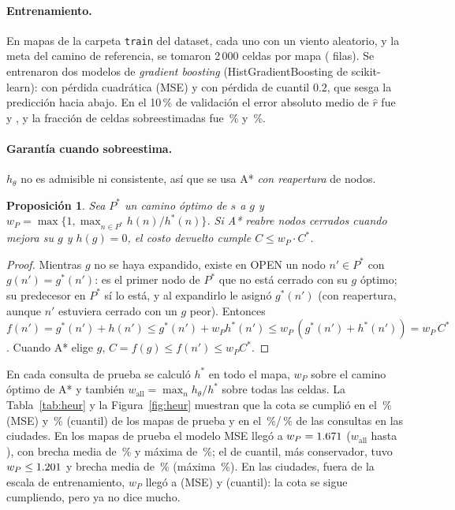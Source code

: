 \documentclass[11pt]{article}
\newtheorem{prop}{Proposición}
\theoremstyle{remark}
\begin{document}
\paragraph{Entrenamiento.} En \hMapas{} mapas de la carpeta \texttt{train} del dataset, cada uno con un
viento aleatorio, y la meta del camino de referencia, se tomaron 2\,000 celdas por mapa (\hFilas{} filas).
Se entrenaron dos modelos de \emph{gradient boosting} (HistGradientBoosting de scikit-learn):
con pérdida cuadrática (MSE) y con pérdida de cuantil $0.2$, que sesga la predicción hacia abajo.
En el 10\,\% de validación el error absoluto medio de $\hat r$ fue \hMaeMse{} y \hMaeQ{}, y la fracción
de celdas sobreestimadas fue \hSobreMse\,\% y \hSobreQ\,\%.

\paragraph{Garantía cuando sobreestima.} $h_\theta$ no es admisible ni consistente, así que se usa
A* \emph{con reapertura} de nodos.

\begin{prop}\label{prop:w}
Sea $P^*$ un camino óptimo de $s$ a $g$ y $w_P=\max\{1,\max_{n\in P^*}h(n)/h^*(n)\}$. Si A* reabre
nodos cerrados cuando mejora su $g$ y $h(g)=0$, el costo devuelto cumple $C\le w_P\cdot C^*$.
\end{prop}
\begin{proof}
Mientras $g$ no se haya expandido, existe en OPEN un nodo $n'\in P^*$ con $g(n')=g^*(n')$: es el
primer nodo de $P^*$ que no está cerrado con su $g$ óptimo; su predecesor en $P^*$ sí lo está, y al
expandirlo le asignó $g^*(n')$ (con reapertura, aunque $n'$ estuviera cerrado con un $g$ peor).
Entonces $f(n')=g^*(n')+h(n')\le g^*(n')+w_Ph^*(n')\le w_P\,(g^*(n')+h^*(n'))=w_P\,C^*$. Cuando A*
elige $g$, $C=f(g)\le f(n')\le w_P C^*$.
\end{proof}

En cada consulta de prueba se calculó $h^*$ en todo el mapa, $w_P$ sobre el camino óptimo de A* y
también $w_{\text{all}}=\max_n h_\theta/h^*$ sobre todas las celdas. La Tabla~\ref{tab:heur} y la
Figura~\ref{fig:heur} muestran que la cota se cumplió en el \hCotaMse\,\% (MSE) y \hCotaQ\,\% (cuantil)
de los \hTest{} mapas de prueba y en el \rCotaMse\,\%/\rCotaQ\,\% de las consultas en las ciudades.
En los mapas de prueba el modelo MSE llegó a $w_P=1.671$ ($w_{\text{all}}$ hasta \hWallMse), con
brecha media de \hGapMse\,\% y máxima de \hGapMaxMse\,\%; el de cuantil, más conservador, tuvo
$w_P\le1.201$ y brecha media de \hGapQ\,\% (máxima \hGapMaxQ\,\%). En las ciudades, fuera de la
escala de entrenamiento, $w_P$ llegó a \rWmaxMse{} (MSE) y \rWmaxQ{} (cuantil): la cota se sigue
cumpliendo, pero ya no dice mucho.
\end{document}
